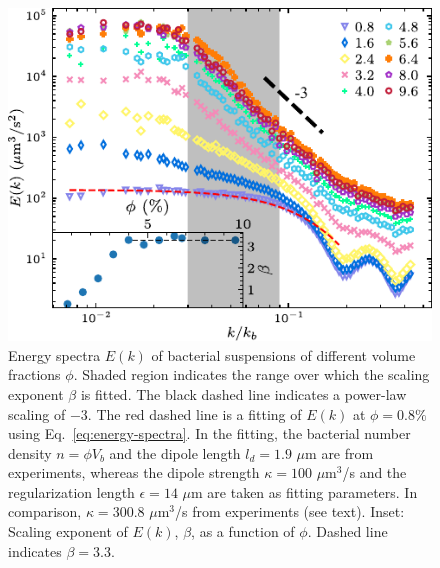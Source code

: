 \begin{figure}[!ht]
\begin{center}
\includegraphics[width=4.5in]{figs/5-GNF/5.pdf}
\caption[Energy spectra in active turbulence]
{
Energy spectra $E(k)$ of bacterial suspensions of different volume fractions $\phi$. Shaded region indicates the range over which the scaling exponent $\beta$ is fitted. The black dashed line indicates a power-law scaling of $-3$. The red dashed line is a fitting of $E(k)$ at $\phi=0.8\%$ using Eq.~\ref{eq:energy-spectra}. In the fitting, the bacterial number density $n=\phi V_b$ and the dipole length $l_d = 1.9$ $\mu$m are from experiments, whereas the dipole strength $\kappa = 100$ $\mu$m$^3$/s and the regularization length $\epsilon = 14$ $\mu$m are taken as fitting parameters. In comparison, $\kappa = 300.8$ $\mu$m$^3$/s from experiments (see text).
Inset: Scaling exponent of $E(k)$, $\beta$, as a function of $\phi$. Dashed line indicates $\beta = 3.3$.
}
\label{fig:energy-spectra}
\end{center}
\end{figure}



